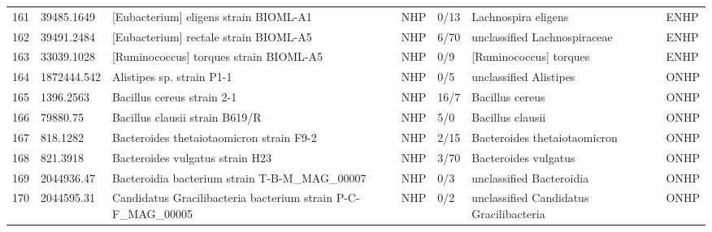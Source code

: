 \begin{longtable}{llllllll}
161 &    39485.1649 &                                    [Eubacterium] eligens strain BIOML-A1 &   NHP &      0/13 &                            Lachnospira eligens &                    \cite{poyet2019library,chung2017prebiotic} &  ENHP \\
162 &    39491.2484 &                                    [Eubacterium] rectale strain BIOML-A5 &   NHP &      6/70 &                   unclassified Lachnospiraceae &            \cite{poyet2019library,rosero2016reclassification} &  ENHP \\
163 &    33039.1028 &                                   [Ruminococcus] torques strain BIOML-A5 &   NHP &       0/9 &                         [Ruminococcus] torques &                   \cite{poyet2019library,togo2018description} &  ENHP \\
164 &   1872444.542 &                                                Alistipes sp. strain P1-1 &   NHP &       0/5 &                         unclassified Alistipes &                                        \cite{parker2020genus} &  ONHP \\
165 &     1396.2563 &                                               Bacillus cereus strain 2-1 &   NHP &      16/7 &                                Bacillus cereus &                             \cite{zhu2016probiotic,1396.2563} &  ONHP \\
166 &      79880.75 &                                           Bacillus clausii strain B619/R &   NHP &       5/0 &                               Bacillus clausii &                                       \cite{princess2020good} &  ONHP \\
167 &      818.1282 &                                 Bacteroides thetaiotaomicron strain F9-2 &   NHP &      2/15 &                   Bacteroides thetaiotaomicron &                            \cite{thornton2012effect,818.1282} &  ONHP \\
168 &      821.3918 &                                          Bacteroides vulgatus strain H23 &   NHP &      3/70 &                           Bacteroides vulgatus &                                            \cite{cuyv2017gut} &  ONHP \\
169 &    2044936.47 &                           Bacteroidia bacterium strain T-B-M\_MAG\_00007 &   NHP &       0/3 &                       unclassified Bacteroidia &                                         \cite{perez2014newly} &  ONHP \\
170 &    2044595.31 &            Candidatus Gracilibacteria bacterium strain P-C-F\_MAG\_00005 &   NHP &       0/2 &        unclassified Candidatus Gracilibacteria &                                  \cite{nibali2020differences} &  ONHP \\

\end{longtable}
